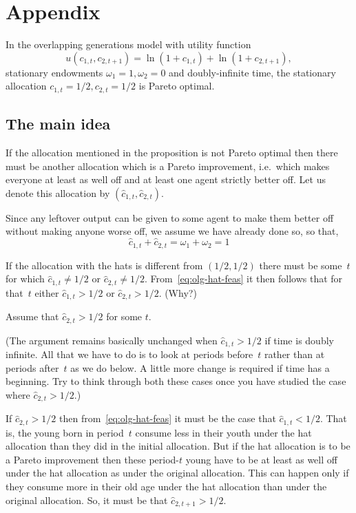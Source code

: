\documentclass[11pt,reqno,openany]{amsbook}
\begin{document}
\section*{Appendix}
\begin{prop}
In the overlapping generations model with utility function
\[u(c_{1,t},c_{2,t+1})=\ln(1+c_{1,t})+\ln(1+c_{2,t+1}),\]
stationary endowments $\omega_1=1, \omega_2=0$ and doubly-infinite
time, the stationary allocation $c_{1,t}=1/2,c_{2,t}=1/2$ is Pareto
optimal.
\end{prop}

\subsection*{The main idea}
If the allocation mentioned in the proposition is not Pareto optimal then
there must be another allocation which is a Pareto improvement, i.e.\
which makes everyone at least as well off and at least one agent
strictly better off. Let us denote this allocation by $(\hat
c_{1,t},\hat c_{2,t})$. 

Since any leftover output can be given to some agent to make them
better off without making anyone worse off, we assume we have already
done so, so that,
\begin{equation}\label{eq:olg-hat-feas}
\hat c_{1,t}+\hat c_{2,t} = \omega_1+\omega_2 =1
\end{equation}

If the allocation with the hats is different from
$(1/2,1/2)$ there must be some~$t$ for which $\hat c_{1,t} \ne 1/2$ or
$\hat c_{2,t} \ne 1/2$. From~\eqref{eq:olg-hat-feas} it then follows
that for that~$t$ either $\hat c_{1,t}>1/2$ or $\hat c_{2,t}>1/2$. (Why?)

Assume that $\hat c_{2,t}>1/2$ for some $t$. 

(The argument remains basically unchanged when $\hat c_{1,t}>1/2$ if
time is doubly infinite. All that we have to do is to look at periods
before~$t$ rather than at periods after~$t$ as we do below. A little
more change is required if time has a beginning. Try to think through
both these cases once you have studied the case where $\hat
c_{2,t}>1/2$.)

If $\hat c_{2,t}>1/2$ then from~\eqref{eq:olg-hat-feas} it must be the
case that $\hat c_{1,t}<1/2$. That is, the young born in period~$t$
consume less in their youth under the hat allocation than they did in
the initial allocation. But if the hat allocation is to be a Pareto
improvement then these period-$t$ young have to be at least as well
off under the hat allocation as under the original allocation. This
can happen only if they consume more in their old age under the hat
allocation than under the original allocation. So, it must be that
$\hat c_{2,t+1}>1/2$.
\end{document}
